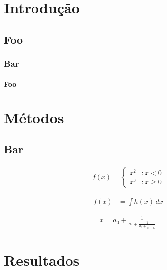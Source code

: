 \documentclass[project]{uftreport}
\begin{document}
\chapter{Introdução}

\lipsum[1] \cite{JW82}  
\lipsum[2] \cite{MenaChalco08} 
\lipsum[3] \cite{alves03:simi}
\section{Foo}
\subsection{Bar}
 \lipsum[4]
\subsubsection{Foo}
\lipsum[5] \cite{bronevetsky02}
\lipsum[6] \cite{garcia01:PhD}
\lipsum[7] \cite{schmidt03:MSc}
\lipsum[8] \cite{alvisi99:analysisCIC}

\chapter{Métodos}

\section{Bar}
\lipsum[9] \cite{CORBA:spec}
\begin{eqnarray}
f(x) = \left\{
  \begin{array}{lr}
    x^2 & : x < 0\\
    x^3 & : x \ge 0
  \end{array}
\right.
\end{eqnarray}

\begin{eqnarray}
f(x) & = \int h(x)\, dx
\end{eqnarray}

\begin{eqnarray}
x = a_0 + \frac{1}{a_1 + \frac{1}{a_2 + \frac{1}{a_3 + a_4}}}
\end{eqnarray}


\chapter{Resultados}
\end{document}
